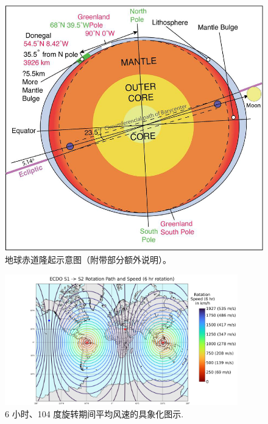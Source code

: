 \documentclass[10pt,twocolumn,letterpaper]{article}
\begin{document}
\begin{figure}[t]
\begin{center}
   \includegraphics[width=1\linewidth]{bulgecrop.png}
\end{center}
   \caption{地球赤道隆起示意图（附带部分额外说明）\cite{16}。}
\label{fig:5}
\label{fig:onecol}
\end{figure}

\begin{figure}[t]
\begin{center}
\includegraphics[width=0.9\textwidth]{rotate2.png}
\end{center}
   \caption{6 小时、104 度旋转期间平均风速的具象化图示\cite{2}.}
   \label{fig:6}
\end{figure}
\end{document}
